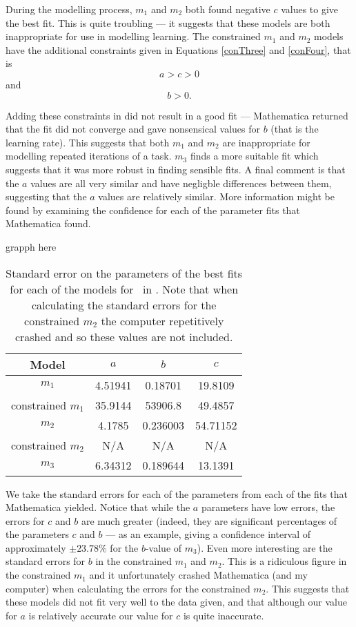 During the modelling process, $m_1$ and $m_2$ both found negative $c$ values to
give the best fit.
This is quite troubling --- it suggests that these models are both inappropriate
for use in modelling learning.
The constrained $m_1$ and $m_2$ models have the additional constraints given in
Equations \ref{conThree} and \ref{conFour}, that is
\[
  a > c > 0
\]
and
\[
  b > 0.
\]

Adding these constraints in did not result in a good fit --- Mathematica
returned that the fit did not converge and gave nonsensical values for $b$ (that
is the learning rate).
This suggests that both $m_1$ and $m_2$ are inappropriate for modelling repeated
iterations of a task.
$m_3$ finds a more suitable fit which suggests that it was more robust in
finding sensible fits.
A final comment is that the $a$ values are all very similar and have negligble
differences between them, suggesting that the $a$ values are relatively similar.
More information might be found by examining the confidence for each of the
parameter fits that Mathematica found.

\FIXME grapph here

\begin{table}[ht!]
\centering
\begin{tabular}{|c|c|c|c|}
\hline
{\bf Model} &  $a$ & $b$ & $c$ \\
\hline
$m_1$ & 4.51941 & 0.18701 & 19.8109 \\
\hline
constrained $m_1$ & 35.9144 & 53906.8 & 49.4857 \\
\hline
$m_2$ & 4.1785 & 0.236003 & 54.71152\\
\hline
constrained $m_2$ & N/A & N/A & N/A \\
\hline
$m_3$ & 6.34312 & 0.189644 & 13.1391 \\
\hline
\end{tabular}
\caption{Standard error on the parameters of the best fits for each of the models for \PO\ in \LA.
Note that when calculating the standard errors for the constrained $m_2$ the
  computer repetitively crashed and so these values are not included.}
\label{table:P1LA:abc:error}
\end{table}

We take the standard errors for each of the parameters from each of the fits that Mathematica yielded.
Notice that while the $a$ parameters have low errors, the errors for $c$ and $b$ are
much greater (indeed, they are significant percentages of the parameters $c$ and
$b$ --- as an example, giving a confidence interval of approximately $\pm
23.78\%$ for the $b$-value of $m_3$).
Even more interesting are the standard errors for $b$ in the constrained $m_1$
and $m_2$.
This is a ridiculous
figure in the constrained $m_1$ and it unfortunately crashed Mathematica (and my
computer) when calculating the errors for the constrained $m_2$.
This suggests that these models did not fit very well to the data given, and
that although our value for $a$ is relatively accurate our value for $c$ is
quite inaccurate.

